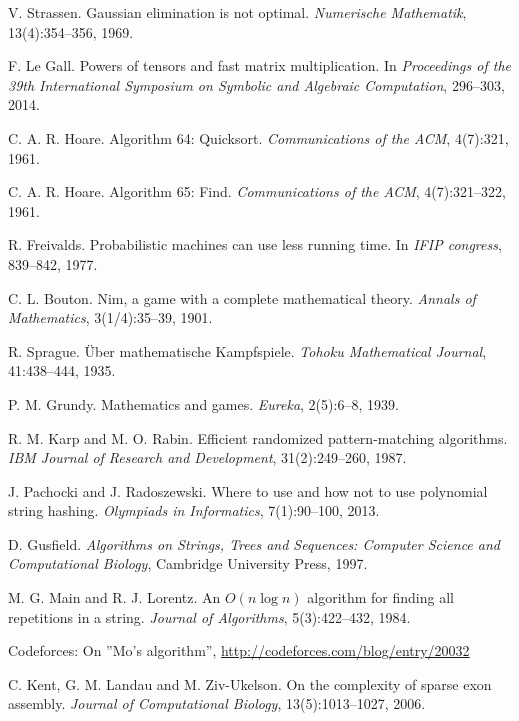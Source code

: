 \begin{thebibliography}{9}
    V. Strassen.
    Gaussian elimination is not optimal.
    \emph{Numerische Mathematik}, 13(4):354--356, 1969.
  
    F. Le Gall.
    Powers of tensors and fast matrix multiplication.
    In \emph{Proceedings of the 39th International Symposium on Symbolic and Algebraic Computation},
    296--303, 2014.
  
    C. A. R. Hoare.
    Algorithm 64: Quicksort.
    \emph{Communications of the ACM}, 4(7):321, 1961.
  
    C. A. R. Hoare.
    Algorithm 65: Find.
    \emph{Communications of the ACM}, 4(7):321--322, 1961.
  
    R. Freivalds.
    Probabilistic machines can use less running time.
    In \emph{IFIP congress}, 839--842, 1977.
  
    C. L. Bouton.
    Nim, a game with a complete mathematical theory.
    \emph{Annals of Mathematics}, 3(1/4):35--39, 1901.
  
    R. Sprague.
    Über mathematische Kampfspiele.
    \emph{Tohoku Mathematical Journal}, 41:438--444, 1935.
  
    P. M. Grundy.
    Mathematics and games.
    \emph{Eureka}, 2(5):6--8, 1939.
  
    R. M. Karp and M. O. Rabin.
    Efficient randomized pattern-matching algorithms.
    \emph{IBM Journal of Research and Development}, 31(2):249--260, 1987.
  
    J. Pachocki and J. Radoszewski.
    Where to use and how not to use polynomial string hashing.
    \emph{Olympiads in Informatics}, 7(1):90--100, 2013.
  
    D. Gusfield.
    \emph{Algorithms on Strings, Trees and Sequences:
    Computer Science and Computational Biology},
    Cambridge University Press, 1997.
  
    M. G. Main and R. J. Lorentz.
    An $O(n \log n)$ algorithm for finding all repetitions in a string.
    \emph{Journal of Algorithms}, 5(3):422--432, 1984.
  
    Codeforces: On ''Mo's algorithm'',
    \url{http://codeforces.com/blog/entry/20032}
  
  
    C. Kent, G. M. Landau and M. Ziv-Ukelson.
    On the complexity of sparse exon assembly.
    \emph{Journal of Computational Biology}, 13(5):1013--1027, 2006.
  

\end{thebibliography}

